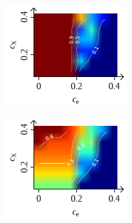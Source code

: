 \documentclass[a4paper, 10pt, twoside, openany]{book} %
\begin{document}
\begin{figure}[b]
		\bigskip
		
		\begin{minipage}[t]{0.31\textwidth}
			\includegraphics[width=\textwidth]{Abbildungen/Phasendiagramme/Exakt/F_G.pdf}
			\label{FGx}
		\end{minipage}
		\hfill
		\begin{minipage}[t]{0.31\textwidth}
			\includegraphics[width=\textwidth]{Abbildungen/Phasendiagramme/Exakt/F_K.pdf}
			\label{FKx}
		\end{minipage}

\end{figure}
\end{document}
